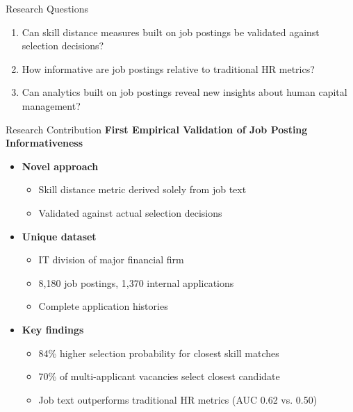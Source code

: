 \documentclass{beamer}
\begin{document}
\begin{frame}{Research Questions}
\begin{enumerate}
    \item Can skill distance measures built on job postings be validated against selection decisions?
    \item How informative are job postings relative to traditional HR metrics?
    \item Can analytics built on job postings reveal new insights about human capital management?
\end{enumerate}
\end{frame}

\begin{frame}{Research Contribution}
\textbf{First Empirical Validation of Job Posting Informativeness}
\begin{itemize}
    \item \textbf{Novel approach}
    \begin{itemize}
        \item Skill distance metric derived solely from job text
        \item Validated against actual selection decisions
    \end{itemize}
    \item \textbf{Unique dataset}
    \begin{itemize}
        \item IT division of major financial firm
        \item 8,180 job postings, 1,370 internal applications
        \item Complete application histories
    \end{itemize}
    \item \textbf{Key findings}
    \begin{itemize}
        \item 84\% higher selection probability for closest skill matches
        \item 70\% of multi-applicant vacancies select closest candidate
        \item Job text outperforms traditional HR metrics (AUC 0.62 vs. 0.50)
    \end{itemize}
\end{itemize}
\end{frame}
\end{document}
